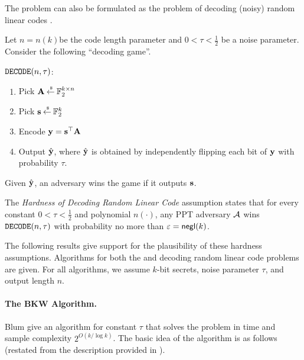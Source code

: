 The \LPN problem can also be formulated as the problem of decoding (noisy) random linear codes \cite{applebaum2008fast}.
\begin{definition}
	Let $n = n(k)$be the code length parameter and $0 < \tau < \frac{1}{2}$ be a noise parameter.
	Consider the following ``decoding game''.
	\begin{boxedalgo}
		$\mathtt{DECODE}(n,\tau)$:
		\vspace*{-8pt}
		\begin{enumerate}
			\itemsep-2pt
			\item Pick ${\mathbf A} \mathbin{\stackrel{\mbox{\,\tiny \$}}{\gets}} {\mathbb F}_2^{k\times n}$
			\item Pick ${\mathbf s} \mathbin{\stackrel{\mbox{\,\tiny \$}}{\gets}} {\mathbb F}_2^{k}$
			\item Encode ${\mathbf y} = {\mathbf s}^\top{\mathbf A}$
			\item Output $\hat{{\mathbf y}}$, where $\hat{{\mathbf y}}$ is obtained by independently flipping each bit of ${\mathbf y}$ with probability $\tau$.
		\end{enumerate}
	Given $\hat{{\mathbf y}}$, an adversary \cA wins the game if it outputs ${\mathbf s}$.
	\end{boxedalgo}

	The {\em Hardness of Decoding Random Linear Code} assumption states that for every constant $0 < \tau < \frac{1}{2}$ and polynomial $n(\cdot)$, any PPT adversary ${\mathcal A}$ wins $\mathtt{DECODE}(n,\tau)$ with probability no more than $\varepsilon = \mathsf{negl}(k)$. 
\end{definition}
The following results give support for the plausibility of these hardness assumptions.
Algorithms for both the \LPN and decoding random linear code problems are given.
For all algorithms, we assume $k$-bit secrets, noise parameter $\tau$, and output length $n$.


\paragraph{The BKW Algorithm.} Blum \etal \cite{STOC:BluKalWas00} give an algorithm for constant $\tau$ that solves the \LPN problem in time and sample complexity $2^{O(k/\log k)}$.
The basic idea of the algorithm is as follows (restated from the description provided in \cite[Section 2]{Levieil06}).

